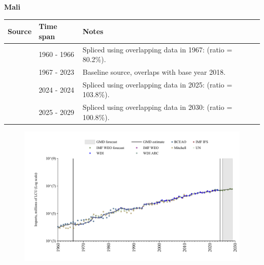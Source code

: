 \documentclass[12pt,a4paper,landscape]{article}
\begin{document}
\begin{adjustbox}{max totalsize={\paperwidth}{\paperheight},center}
\begin{minipage}[t][\textheight][t]{\textwidth}
\vspace*{0.5cm}
{}
\begin{center}
{\Large\bfseries Mali}
\end{center}
\vspace{0.5cm}
\begin{table}[H]
\centering
\small
\begin{tabular}{|l|l|l|}
\hline
\textbf{Source} & \textbf{Time span} & \textbf{Notes} \\
\hline
\rowcolor{white}\cite{BCEAO}& 1960 - 1966 &Spliced using overlapping data in 1967: (ratio = 80.2\%).\\
\rowcolor{lightgray}\cite{WDI}& 1967 - 2023 &Baseline source, overlaps with base year 2018.\\
\rowcolor{white}\cite{BCEAO}& 2024 - 2024 &Spliced using overlapping data in 2025: (ratio = 103.8\%).\\
\rowcolor{lightgray}\cite{IMF_WEO_forecast}& 2025 - 2029 &Spliced using overlapping data in 2030: (ratio = 100.8\%).\\
\hline
\end{tabular}
\end{table}
\begin{figure}[H]
\centering
\includegraphics[width=\textwidth,height=0.6\textheight,keepaspectratio]{graphs/MLI_imports.pdf}
\end{figure}
\end{minipage}
\end{adjustbox}
\end{document}
